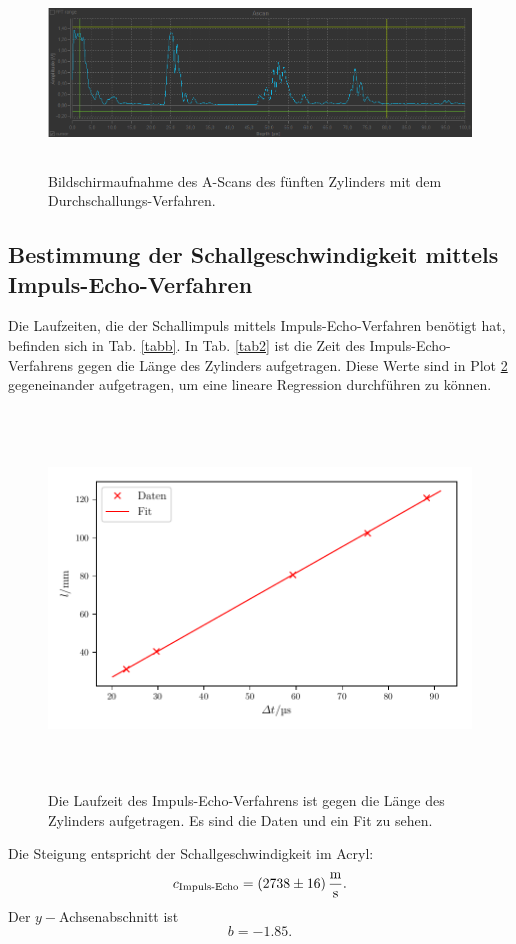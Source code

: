 \begin{figure}
    \centering
    \includegraphics[width=15cm, height=5cm]{build/Messung3.5.png}
    \caption{Bildschirmaufnahme des A-Scans des fünften Zylinders mit dem Durchschallungs-Verfahren.}
    \label{fig:m3.5}
\end{figure}

\subsection{Bestimmung der Schallgeschwindigkeit mittels Impuls-Echo-Verfahren}
Die Laufzeiten, die der Schallimpuls mittels Impuls-Echo-Verfahren benötigt hat,
befinden sich in Tab. \ref{tabb}. In Tab. \ref{tab2} ist die Zeit des Impuls-Echo-Verfahrens
gegen die Länge des Zylinders aufgetragen. Diese Werte sind in Plot \ref{fig:plot2}
gegeneinander aufgetragen, um eine lineare Regression durchführen zu können.


\begin{figure}
    \centering
    \includegraphics[width=15cm, height=10cm]{build/plot2.pdf}
    \caption{Die Laufzeit des Impuls-Echo-Verfahrens ist gegen die Länge des Zylinders
    aufgetragen. Es sind die Daten und ein Fit zu sehen.}
    \label{fig:plot2}
\end{figure}
\noindent Die Steigung entspricht der Schallgeschwindigkeit im Acryl:
\begin{equation*}
    c_{\text{Impuls-Echo}} = \SI{2738 \pm 16}{\meter\per\second}.
\end{equation*}
\noindent Der $y-$Achsenabschnitt ist
\begin{equation*}
   b = \num{-1.85}. 
\end{equation*}


